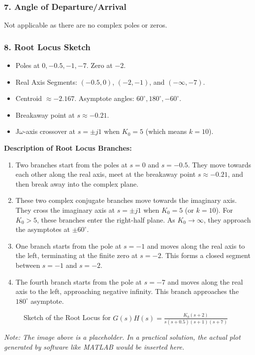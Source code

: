 \documentclass{article}
\begin{document}
	\subsubsection*{7. Angle of Departure/Arrival}
	Not applicable as there are no complex poles or zeros.
	
	\subsubsection*{8. Root Locus Sketch}
	\begin{itemize}
		\item Poles at $0, -0.5, -1, -7$. Zero at $-2$.
		\item Real Axis Segments: $(-0.5, 0)$, $(-2, -1)$, and $(-\infty, -7)$.
		\item Centroid $\approx -2.167$. Asymptote angles: $60^\circ, 180^\circ, -60^\circ$.
		\item Breakaway point at $s \approx -0.21$.
		\item J$\omega$-axis crossover at $s = \pm j1$ when $K_0 = 5$ (which means $k=10$).
	\end{itemize}
	
	\textbf{Description of Root Locus Branches:}
	\begin{enumerate}
		\item Two branches start from the poles at $s=0$ and $s=-0.5$. They move towards each other along the real axis, meet at the breakaway point $s \approx -0.21$, and then break away into the complex plane.
		\item These two complex conjugate branches move towards the imaginary axis. They cross the imaginary axis at $s = \pm j1$ when $K_0=5$ (or $k=10$). For $K_0 > 5$, these branches enter the right-half plane. As $K_0 \to \infty$, they approach the asymptotes at $\pm 60^\circ$.
		\item One branch starts from the pole at $s=-1$ and moves along the real axis to the left, terminating at the finite zero at $s=-2$. This forms a closed segment between $s=-1$ and $s=-2$.
		\item The fourth branch starts from the pole at $s=-7$ and moves along the real axis to the left, approaching negative infinity. This branch approaches the $180^\circ$ asymptote.
	\end{enumerate}
	
	\begin{figure}[h!]
		\centering
		\caption{Sketch of the Root Locus for $G(s)H(s) = \frac{K_0(s+2)}{s(s+0.5)(s+1)(s+7)}$}
		\label{fig:root_locus}
	\end{figure}
	\textit{Note: The image above is a placeholder. In a practical solution, the actual plot generated by software like MATLAB would be inserted here.}
	
\end{document}
